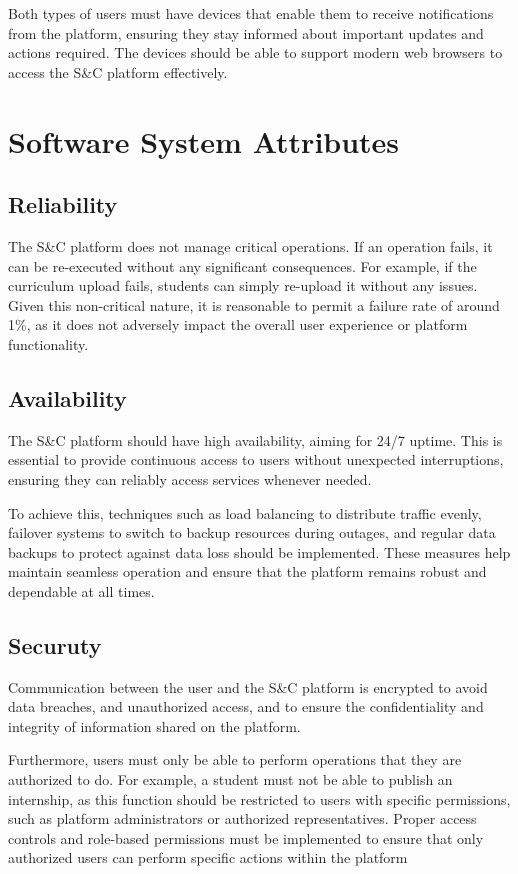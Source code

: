 Both types of users must have devices that enable them to receive notifications from the platform, ensuring they stay informed about important updates and actions required. The devices should be able to support modern web browsers to access the S\&C platform effectively.


\section{Software System Attributes}
\subsection{Reliability}

The S\&C platform does not manage critical operations. If an operation fails, it can be re-executed without any significant consequences. For example, if the curriculum upload fails, students can simply re-upload it without any issues. Given this non-critical nature, it is reasonable to permit a failure rate of around 1\%, as it does not adversely impact the overall user experience or platform functionality.
 
\subsection{Availability}

The S\&C platform should have high availability, aiming for 24/7 uptime. This is essential to provide continuous access to users without unexpected interruptions, ensuring they can reliably access services whenever needed.

To achieve this, techniques such as load balancing to distribute traffic evenly, failover systems to switch to backup resources during outages, and regular data backups to protect against data loss should be implemented. These measures help maintain seamless operation and ensure that the platform remains robust and dependable at all times.

\subsection{Securuty}

Communication between the user and the S\&C platform is encrypted to avoid data breaches, and unauthorized access, and to ensure the confidentiality and integrity of information shared on the platform.

Furthermore, users must only be able to perform operations that they are authorized to do. For example, a student must not be able to publish an internship, as this function should be restricted to users with specific permissions, such as platform administrators or authorized representatives. Proper access controls and role-based permissions must be implemented to ensure that only authorized users can perform specific actions within the platform
 
